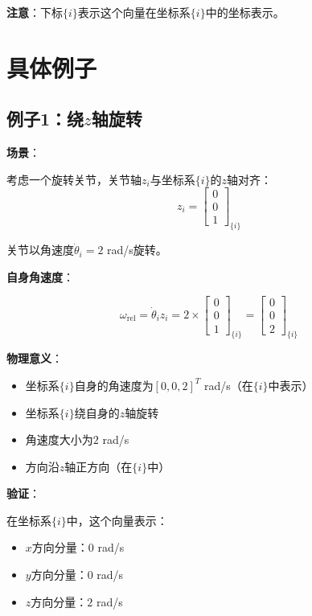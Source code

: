 \documentclass[12pt,a4paper]{article}
\begin{document}
\textbf{注意}：下标$\{i\}$表示这个向量在坐标系$\{i\}$中的坐标表示。

\section{具体例子}

\subsection{例子1：绕$z$轴旋转}

\textbf{场景}：

考虑一个旋转关节，关节轴$z_i$与坐标系$\{i\}$的$z$轴对齐：
\begin{equation}
z_i = \begin{bmatrix} 0 \\ 0 \\ 1 \end{bmatrix}_{\{i\}}
\end{equation}

关节以角速度$\dot{\theta}_i = 2$ rad/s旋转。

\textbf{自身角速度}：

\begin{equation}
\omega_{\text{rel}} = \dot{\theta}_i z_i = 2 \times \begin{bmatrix} 0 \\ 0 \\ 1 \end{bmatrix}_{\{i\}} = \begin{bmatrix} 0 \\ 0 \\ 2 \end{bmatrix}_{\{i\}}
\end{equation}

\textbf{物理意义}：
\begin{itemize}
\item 坐标系$\{i\}$自身的角速度为$[0, 0, 2]^T$ rad/s（在$\{i\}$中表示）
\item 坐标系$\{i\}$绕自身的$z$轴旋转
\item 角速度大小为$2$ rad/s
\item 方向沿$z$轴正方向（在$\{i\}$中）
\end{itemize}

\textbf{验证}：

在坐标系$\{i\}$中，这个向量表示：
\begin{itemize}
\item $x$方向分量：$0$ rad/s
\item $y$方向分量：$0$ rad/s
\item $z$方向分量：$2$ rad/s
\end{itemize}
\end{document}
